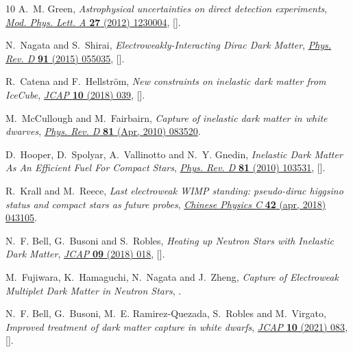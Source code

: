 \documentclass[11pt]{article}
\begin{document}
\begin{thebibliography}{10}
A.~M. Green, \emph{{Astrophysical uncertainties on direct detection
  experiments}}, \href{https://doi.org/10.1142/S0217732312300042}{\emph{Mod.
  Phys. Lett. A} {\bfseries 27} (2012) 1230004},
  [\href{https://arxiv.org/abs/1112.0524}{{}}].

N.~Nagata and S.~Shirai, \emph{{Electroweakly-Interacting Dirac Dark Matter}},
  \href{https://doi.org/10.1103/PhysRevD.91.055035}{\emph{Phys. Rev. D}
  {\bfseries 91} (2015) 055035},
  [\href{https://arxiv.org/abs/1411.0752}{{}}].

R.~Catena and F.~Hellstr\"om, \emph{{New constraints on inelastic dark matter
  from IceCube}},
  \href{https://doi.org/10.1088/1475-7516/2018/10/039}{\emph{JCAP} {\bfseries
  10} (2018) 039}, [\href{https://arxiv.org/abs/1808.08082}{{}}].

M.~McCullough and M.~Fairbairn, \emph{Capture of inelastic dark matter in white
  dwarves}, \href{https://doi.org/10.1103/PhysRevD.81.083520}{\emph{Phys. Rev.
  D} {\bfseries 81} (Apr, 2010) 083520}.

D.~Hooper, D.~Spolyar, A.~Vallinotto and N.~Y. Gnedin, \emph{{Inelastic Dark
  Matter As An Efficient Fuel For Compact Stars}},
  \href{https://doi.org/10.1103/PhysRevD.81.103531}{\emph{Phys. Rev. D}
  {\bfseries 81} (2010) 103531},
  [\href{https://arxiv.org/abs/1002.0005}{{}}].

R.~Krall and M.~Reece, \emph{Last electroweak {WIMP} standing: pseudo-dirac
  higgsino status and compact stars as future probes},
  \href{https://doi.org/10.1088/1674-1137/42/4/043105}{\emph{Chinese Physics C}
  {\bfseries 42} (apr, 2018) 043105}.

N.~F. Bell, G.~Busoni and S.~Robles, \emph{{Heating up Neutron Stars with
  Inelastic Dark Matter}},
  \href{https://doi.org/10.1088/1475-7516/2018/09/018}{\emph{JCAP} {\bfseries
  09} (2018) 018}, [\href{https://arxiv.org/abs/1807.02840}{{}}].

M.~Fujiwara, K.~Hamaguchi, N.~Nagata and J.~Zheng, \emph{{Capture of
  Electroweak Multiplet Dark Matter in Neutron Stars}},
  \href{https://arxiv.org/abs/2204.02238}{{}}.

N.~F. Bell, G.~Busoni, M.~E. Ramirez-Quezada, S.~Robles and M.~Virgato,
  \emph{{Improved treatment of dark matter capture in white dwarfs}},
  \href{https://doi.org/10.1088/1475-7516/2021/10/083}{\emph{JCAP} {\bfseries
  10} (2021) 083}, [\href{https://arxiv.org/abs/2104.14367}{{}}].


\end{thebibliography}
\end{document}
